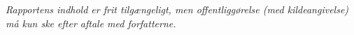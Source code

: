 \vfill

{\footnotesize\itshape Rapportens indhold er frit tilgængeligt, men offentliggørelse (med kildeangivelse) må kun ske efter aftale med forfatterne.}

